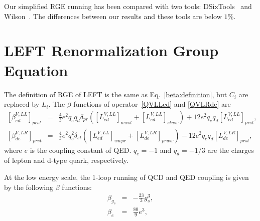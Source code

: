 \documentclass[a4paper,11pt]{article}
\begin{document}
Our simplified RGE running has been compared with two tools: DSixTools~\cite{Celis:2017hod,Fuentes-Martin:2020zaz} and Wilson~\cite{Aebischer:2018bkb}.
The differences between our results and these tools are below $1\%$.


\section{LEFT Renormalization Group Equation}\label{leftrge}

The definition of RGE of LEFT is the same as Eq.~\ref{beta:definition}, but $C_i$ are replaced by $L_i$.
The $\beta$ functions of operator~\ref{QVLLed} and \ref{QVLRde} are
\begin{eqnarray}
  \left[\beta^{V,LL}_{ed}\right]_{prst} &=& \frac{4}{3}e^2q_eq_d\delta_{pr}\left([L^{V,LL}_{ed}]_{wwst}+[L^{V,LL}_{ed}]_{stww}\right)+12e^2q_eq_d[L^{V,LL}_{ed}]_{prst},  \label{beta:VLLed} \\
  \left[\beta^{V,LR}_{de}\right]_{prst} &=& \frac{4}{3}e^2q^2_e\delta_{st}\left([L^{V,LL}_{ed}]_{wwpr}+[L^{V,LR}_{de}]_{prww}\right)-12e^2q_eq_d[L^{V,LR}_{de}]_{prst}, \label{beta:VLRde}
\end{eqnarray}
where $e$ is the coupling constant of QED. 
$q_e=-1$ and $q_d=-1/3$ are the charges of lepton and d-type quark, respectively. 

At the low energy scale, the 1-loop running of QCD and QED coupling is given by the following $\beta$ functions:
\begin{eqnarray}
  \beta_{g_s} &=& -\frac{23}{3}g^3_s,  \\
  \beta_{e} &=& \frac{80}{9}e^3, 
\end{eqnarray}







		
		

		
\end{document}

